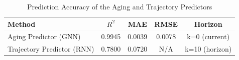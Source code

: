 \begin{table}[h]
\centering
\caption{Prediction Accuracy of the Aging and Trajectory Predictors}
\label{tab:prediction_accuracy}
\begin{tabular}{lcccc}
\toprule
Method & $R^2$ & MAE & RMSE & Horizon \\
\midrule
Aging Predictor (GNN) & 0.9945 & 0.0039 & 0.0078 & k=0 (current) \\
Trajectory Predictor (RNN) & 0.7800 & 0.0720 & N/A & k=10 (horizon) \\
\bottomrule
\end{tabular}
\end{table}